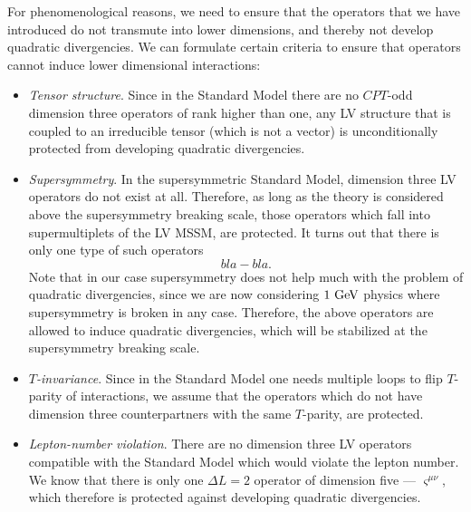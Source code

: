 \documentclass[12pt,preprintnumbers,nofootinbib]{revtex4}
\newcommand{\GeV}{{\rm GeV}}
\begin{document}
	For phenomenological reasons, we need to ensure that the operators that we have
	introduced do not transmute into lower dimensions, and thereby not develop quadratic
	divergencies. 
	We can formulate certain criteria to ensure that operators cannot induce lower dimensional
	interactions:
\begin{itemize}
\item	{\it Tensor structure}. Since in the Standard Model there are no $CPT$-odd  
	dimension three operators of rank higher than one, any LV structure that is coupled
	to an irreducible tensor (which is not a vector) is unconditionally protected from
	developing quadratic divergencies.
\item	{\it Supersymmetry}. In the supersymmetric Standard Model, dimension three LV operators
	do not exist at all. 
	Therefore, as long as the theory is considered above the supersymmetry breaking scale, 
	those operators which fall into supermultiplets of the LV MSSM, are protected.
	It turns out that there is only one type of such operators
\begin{equation}
\label{SUSY_prot}
	bla-bla.
\end{equation}	
	Note that in our case supersymmetry does not help much with the problem of quadratic 
	divergencies, since we are now considering $ 1~\GeV $ physics where supersymmetry
	is broken in any case. 
	Therefore, the above operators are allowed to induce quadratic divergencies, which will
	be stabilized at the supersymmetry breaking scale. 

\item	{\it $T$-invariance}. Since in the Standard Model one needs multiple loops to flip
	$ T $-parity of interactions, we assume that the operators which do not have dimension
	three counterpartners with the same $ T $-parity, are protected.

\item	{\it Lepton-number violation}. There are no dimension three LV operators compatible with
	the Standard Model which would violate the lepton number. 
	We know that there is only one $ \Delta L = 2 $ operator of dimension five --- 
	$ \varsigma^{\mu\nu} $, which therefore is protected against developing quadratic divergencies.
\end{itemize}
	
\end{document}
